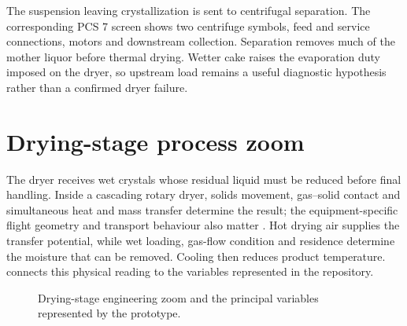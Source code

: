 The suspension leaving crystallization is sent to centrifugal separation. The corresponding PCS 7 screen shows two centrifuge symbols, feed and service connections, motors and downstream collection. Separation removes much of the mother liquor before thermal drying. Wetter cake raises the evaporation duty imposed on the dryer, so upstream load remains a useful diagnostic hypothesis rather than a confirmed dryer failure.

\section{Drying-stage process zoom}

The dryer receives wet crystals whose residual liquid must be reduced before final handling. Inside a cascading rotary dryer, solids movement, gas--solid contact and simultaneous heat and mass transfer determine the result; the equipment-specific flight geometry and transport behaviour also matter \cite{rousselet2016}. Hot drying air supplies the transfer potential, while wet loading, gas-flow condition and residence determine the moisture that can be removed. Cooling then reduces product temperature.  connects this physical reading to the variables represented in the repository.

\begin{figure}[ht]
\centering
{}
\caption{Drying-stage engineering zoom and the principal variables represented by the prototype.}
\label{fig:dryzoom}
\end{figure}

